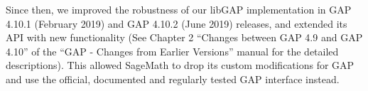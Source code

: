 \documentclass{deliverablereport}
\begin{document}
Since then, we improved the robustness of our libGAP implementation
in GAP 4.10.1 (February 2019) and GAP 4.10.2 (June 2019) releases,
and extended its API with new functionality (See Chapter 2 
``Changes between GAP 4.9 and GAP 4.10'' of the 
``GAP - Changes from Earlier Versions'' manual for the detailed
descriptions). This allowed SageMath to drop its custom 
modifications for GAP and use the official, documented and regularly 
tested GAP interface instead.
%
%
%
%
%
%
%
%
%
%
%
%
%
%
%
%
%
%
%
%
%
%
%
%
%
%
\end{document}
